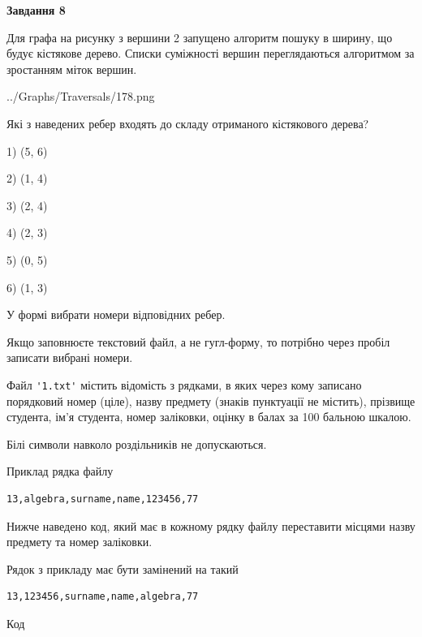\documentclass[12pt, ukrainian]{article}
\def\code#1{\Verb!#1!}
\begin{document}
{\begin {large}
{\begin {center}\textbf{Завдання 8}\end {center}}\par
Для графа на рисунку з вершини 2 запущено алгоритм пошуку в ширину, що будує кістякове дерево. Списки суміжності вершин переглядаються алгоритмом за зростанням міток вершин.\par
\begin{center}
	{../Graphs/Traversals/178.png}
\end{center}
\par Які з наведених ребер входять до складу отриманого кістякового дерева?\par
1) (5, 6)\par
2) (1, 4)\par
3) (2, 4)\par
4) (2, 3)\par
5) (0, 5)\par
6) (1, 3)\par
{\vskip 15pt} У формі вибрати номери відповідних ребер.


Якщо заповнюєте текстовий файл, а не гугл-форму, то потрібно через пробіл записа\-ти вибрані номери.\par
\newpage


Файл \code{'1.txt'} містить відомість з рядками, в яких через кому записано поряд\-ковий номер (ціле), назву предмету (знаків пунктуації не містить), прізвище студента, ім'я студента, номер заліковки, оцінку в балах за 100 бальною шкалою.

Білі символи навколо роздільників не допускаються.

Приклад рядка файлу



\begin{verbatim}
13,algebra,surname,name,123456,77
\end{verbatim}


Нижче наведено код, який має в кожному рядку файлу переставити місцями назву предмету та номер заліковки.

Рядок з прикладу має бути замінений на такий



\begin{verbatim}
13,123456,surname,name,algebra,77
\end{verbatim}




Код




\end{large}}
\end{document}
